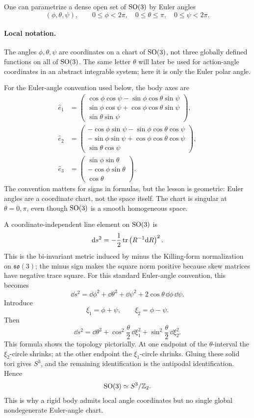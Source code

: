 One can parametrize a dense open set of \(\operatorname{SO}(3)\) by Euler angles
\[
  (\phi,\theta,\psi),
  \qquad
  0\leq \phi<2\pi,\quad 0\leq \theta\leq \pi,\quad 0\leq \psi<2\pi.
\]

\paragraph{Local notation.}
The angles \(\phi,\theta,\psi\) are coordinates on a chart of \(\operatorname{SO}(3)\), not
three globally defined functions on all of \(\operatorname{SO}(3)\).  The same letter
\(\theta\) will later be used for action-angle coordinates in an abstract
integrable system; here it is only the Euler polar angle.

For the Euler-angle convention used below, the body axes are
\[
\begin{aligned}
\hat e_1 &=
\begin{pmatrix}
\cos\phi\cos\psi-\sin\phi\cos\theta\sin\psi\\
\sin\phi\cos\psi+\cos\phi\cos\theta\sin\psi\\
\sin\theta\sin\psi
\end{pmatrix},\\
\hat e_2 &=
\begin{pmatrix}
-\cos\phi\sin\psi-\sin\phi\cos\theta\cos\psi\\
-\sin\phi\sin\psi+\cos\phi\cos\theta\cos\psi\\
\sin\theta\cos\psi
\end{pmatrix},\\
\hat e_3 &=
\begin{pmatrix}
\sin\phi\sin\theta\\
-\cos\phi\sin\theta\\
\cos\theta
\end{pmatrix}.
\end{aligned}
\]
The convention matters for signs in formulas, but the lesson is geometric:
Euler angles are a coordinate chart, not the space itself. The chart is singular at
\(\theta=0,\pi\), even though \(\operatorname{SO}(3)\) is a smooth homogeneous space.

A coordinate-independent line element on \(\operatorname{SO}(3)\) is
\[
  \mathrm{d} s^2=-\frac12\operatorname{tr}\left(R^{-1}\mathrm{d} R\right)^2.
\]
This is the bi-invariant metric induced by minus the Killing-form normalization
on \(\mathfrak{so}(3)\); the minus sign makes the square norm positive because
skew matrices have negative trace square.
For this standard Euler-angle convention, this becomes
\[
  \dd s^2
  =
  \dd\phi^2+\dd\theta^2+\dd\psi^2
  +2\cos\theta\,\dd\phi\,\dd\psi.
\]
Introduce
\[
  \xi_1=\phi+\psi,\qquad \xi_2=\phi-\psi.
\]
Then
\[
  \dd s^2
  =
  \dd\theta^2
  +
  \cos^2\frac{\theta}{2}\,\dd\xi_1^2
  +
  \sin^2\frac{\theta}{2}\,\dd\xi_2^2.
\]
This formula shows the topology pictorially. At one endpoint of the
\(\theta\)-interval the \(\xi_2\)-circle shrinks; at the other endpoint the
\(\xi_1\)-circle shrinks. Gluing these solid tori gives \(S^3\), and the
remaining identification is the antipodal identification. Hence
\[
  \operatorname{SO}(3)\simeq S^3/\mathbb{Z}_2.
\]
This is why a rigid body admits local angle coordinates but no single global
nondegenerate Euler-angle chart.

